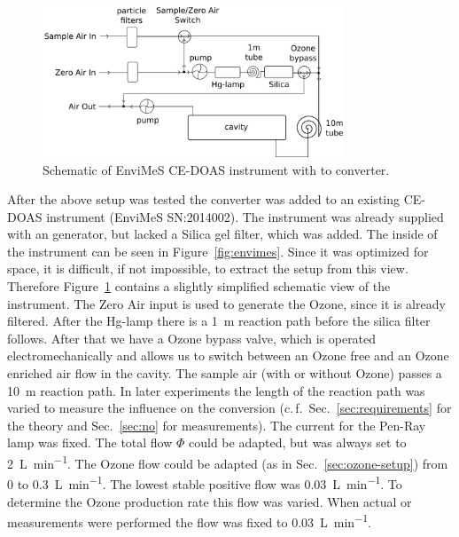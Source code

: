 \begin{figure}[htbp]
  \centering
  \includegraphics[width=0.8\textwidth]{images/envimes_setup.png}
  \caption{Schematic of EnviMeS CE-DOAS instrument with  to
     converter.}
  \label{fig:envimes-schematic}
\end{figure}

After the above setup was tested the converter was added to an
existing CE-DOAS instrument (EnviMeS SN:2014002). The instrument was already supplied with an 
generator, but lacked a Silica gel filter, which was added. The inside
of the instrument can be seen in Figure~\ref{fig:envimes}. Since it
was optimized for space, it is difficult, if not impossible, to extract
the setup from this view. Therefore Figure~\ref{fig:envimes-schematic}
contains a slightly simplified schematic view of the instrument. The
Zero Air input is used to
generate the Ozone, since it is already filtered. After the Hg-lamp
there is a \SI{1}{\meter} reaction path before the silica filter
follows. After that we have a Ozone bypass valve, which is operated
electromechanically and allows us to switch between an Ozone free and
an Ozone enriched air flow in the cavity. The sample air (with or
without Ozone) passes a \SI{10}{\meter} reaction path. In later
experiments the length of the reaction path was varied to measure the
influence on the  conversion (c.\,f.\
Sec.~\ref{sec:requirements} for the theory and Sec.~\ref{sec:no} for
measurements). The current for the Pen-Ray lamp was fixed. The total
flow $\Phi$ could be adapted, but was always set to
\SI{2}{\liter\per\minute}. The Ozone flow could be adapted (as in
Sec.~\ref{sec:ozone-setup}) from 0 to \SI{0.3}{\liter\per\minute}. The
lowest stable positive flow was \SI{0.03}{\liter\per\minute}. To
determine the Ozone production rate this flow was varied. When actual
\ch{NO} or \ch{NO_x}\todo{define NOx somewhere} measurements were
performed the flow was fixed to \SI{0.03}{\liter\per\minute}.

